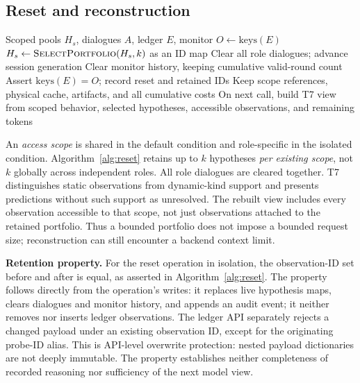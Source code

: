 \documentclass[letterpaper,journal]{IEEEtran}
\begin{document}
\subsection{Reset and reconstruction}\label{sec:reset}
\begin{algorithm}[t]
\caption{Evidence-preserving reset}\label{alg:reset}
\begin{algorithmic}[1]\small
\Require Scoped pools $H_s$, dialogues $A$, ledger $E$, monitor
\State $O\gets\mathrm{keys}(E)$
    \State $H_s\gets\textsc{SelectPortfolio}(H_s,k)$ as an ID map
  \EndIf
\EndFor
\State Clear all role dialogues; advance session generation
\State Clear monitor history, keeping cumulative valid-round count
\State Assert $\mathrm{keys}(E)=O$; record reset and retained IDs
\State Keep scope references, physical cache, artifacts, and all cumulative costs
\State On next call, build T7 view from scoped behavior, selected hypotheses, accessible observations, and remaining tokens
\end{algorithmic}
\end{algorithm}

An \emph{access scope} is shared in the default condition and role-specific in the isolated condition. Algorithm~\ref{alg:reset} retains up to $k$ hypotheses \emph{per existing scope}, not $k$ globally across independent roles. All role dialogues are cleared together. T7 distinguishes static observations from dynamic-kind support and presents predictions without such support as unresolved. The rebuilt view includes every observation accessible to that scope, not just observations attached to the retained portfolio. Thus a bounded portfolio does not impose a bounded request size; reconstruction can still encounter a backend context limit.

\textbf{Retention property.} For the reset operation in isolation, the observation-ID set before and after is equal, as asserted in Algorithm~\ref{alg:reset}. The property follows directly from the operation's writes: it replaces live hypothesis maps, clears dialogues and monitor history, and appends an audit event; it neither removes nor inserts ledger observations. The ledger API separately rejects a changed payload under an existing observation ID, except for the originating probe-ID alias. This is API-level overwrite protection: nested payload dictionaries are not deeply immutable. The property establishes neither completeness of recorded reasoning nor sufficiency of the next model view.
\end{document}
